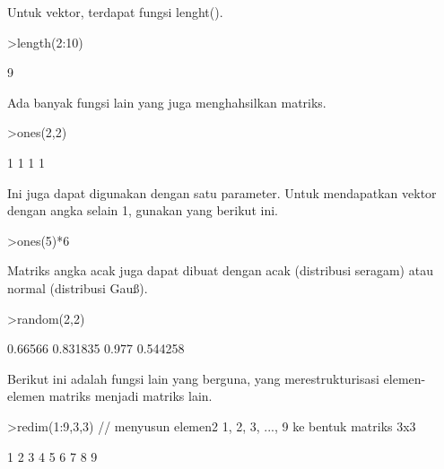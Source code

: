\documentclass{article}
\begin{document}
\begin{eulernotebook}
\begin{eulercomment}
Untuk vektor, terdapat fungsi lenght().
\end{eulercomment}
\begin{eulerprompt}
>length(2:10)
\end{eulerprompt}
\begin{euleroutput}
  9
\end{euleroutput}
\begin{eulercomment}
Ada banyak fungsi lain yang juga menghahsilkan matriks.
\end{eulercomment}
\begin{eulerprompt}
>ones(2,2)
\end{eulerprompt}
\begin{euleroutput}
              1             1 
              1             1 
\end{euleroutput}
\begin{eulercomment}
Ini juga dapat digunakan dengan satu parameter. Untuk mendapatkan
vektor dengan angka selain 1, gunakan yang berikut ini.
\end{eulercomment}
\begin{eulerprompt}
>ones(5)*6
\end{eulerprompt}
\begin{euleroutput}
  [6,  6,  6,  6,  6]
\end{euleroutput}
\begin{eulercomment}
Matriks angka acak juga dapat dibuat dengan acak (distribusi seragam)
atau normal (distribusi Gauß).
\end{eulercomment}
\begin{eulerprompt}
>random(2,2)
\end{eulerprompt}
\begin{euleroutput}
        0.66566      0.831835 
          0.977      0.544258 
\end{euleroutput}
\begin{eulercomment}
Berikut ini adalah fungsi lain yang berguna, yang merestrukturisasi
elemen-elemen matriks menjadi matriks lain.
\end{eulercomment}
\begin{eulerprompt}
>redim(1:9,3,3) // menyusun elemen2 1, 2, 3, ..., 9 ke bentuk matriks 3x3
\end{eulerprompt}
\begin{euleroutput}
              1             2             3 
              4             5             6 
              7             8             9 
\end{euleroutput}
\begin{eulercomment}

\end{eulercomment}
\end{eulernotebook}
\end{document}
